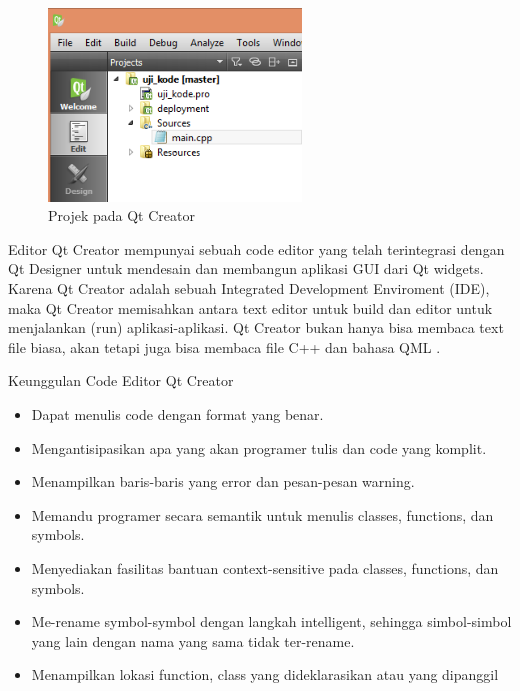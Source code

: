 \begin{figure}[htbp]
\centering 
\includegraphics[width=0.6\textwidth]{images/capture1-1.png}
\caption{Projek pada Qt Creator}
\end{figure}\label{projek-pada-qt-creator}

Editor Qt Creator mempunyai sebuah code editor yang telah terintegrasi
dengan Qt Designer untuk mendesain dan membangun aplikasi GUI dari Qt
widgets. Karena Qt Creator adalah sebuah Integrated Development
Enviroment (IDE), maka Qt Creator memisahkan antara text editor untuk
build dan editor untuk menjalankan (run) aplikasi-aplikasi. Qt Creator
bukan hanya bisa membaca text file biasa, akan tetapi juga bisa membaca
file C++ dan bahasa QML .

Keunggulan Code Editor Qt Creator

\begin{itemize}
\tightlist
\item
  Dapat menulis code dengan format yang benar.
\item
  Mengantisipasikan apa yang akan programer tulis dan code yang komplit.
\item
  Menampilkan baris-baris yang error dan pesan-pesan warning.
\item
  Memandu programer secara semantik untuk menulis classes, functions,
  dan symbols.
\item
  Menyediakan fasilitas bantuan context-sensitive pada classes,
  functions, dan symbols.
\item
  Me-rename symbol-symbol dengan langkah intelligent, sehingga
  simbol-simbol yang lain dengan nama yang sama tidak ter-rename.
\item
  Menampilkan lokasi function, class yang dideklarasikan atau yang
  dipanggil
\end{itemize}


